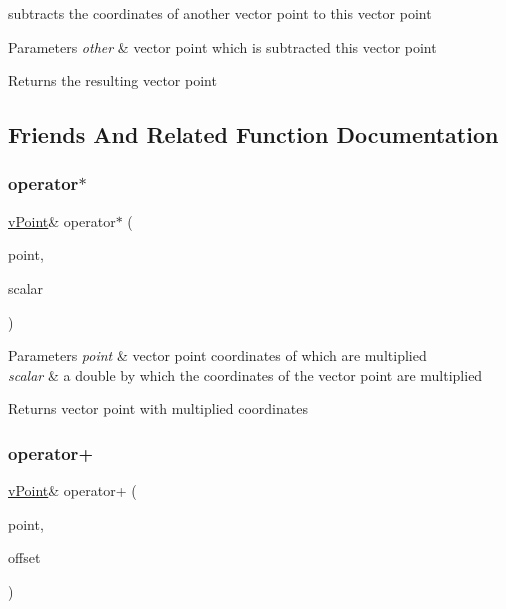 subtracts the coordinates of another vector point to this vector point 
\begin{DoxyParams}{Parameters}
{\em other} & vector point which is subtracted this vector point \\
\hline
\end{DoxyParams}
\begin{DoxyReturn}{Returns}
the resulting vector point 
\end{DoxyReturn}


\subsection{Friends And Related Function Documentation}
\mbox{\label{classv_point_a3aab0a4b27ca1c92c3e690bfe7752ddd}} 
\subsubsection{\texorpdfstring{operator$\ast$}{operator*}}
{\footnotesize\ttfamily \hyperlink{classv_point}{v\+Point}\& operator$\ast$ (\begin{DoxyParamCaption}\item[{const \hyperlink{classv_point}{v\+Point} \&}]{point,  }\item[{double}]{scalar }\end{DoxyParamCaption})\hspace{0.3cm}{\ttfamily [friend]}}


\begin{DoxyParams}{Parameters}
{\em point} & vector point coordinates of which are multiplied \\
\hline
{\em scalar} & a double by which the coordinates of the vector point are multiplied \\
\hline
\end{DoxyParams}
\begin{DoxyReturn}{Returns}
vector point with multiplied coordinates 
\end{DoxyReturn}
\mbox{\label{classv_point_ab409b6cbfb4ba84f7040ddcff0950ea3}} 
\subsubsection{\texorpdfstring{operator+}{operator+}}
{\footnotesize\ttfamily \hyperlink{classv_point}{v\+Point}\& operator+ (\begin{DoxyParamCaption}\item[{const \hyperlink{classv_point}{v\+Point} \&}]{point,  }\item[{double}]{offset }\end{DoxyParamCaption})\hspace{0.3cm}{\ttfamily [friend]}}

